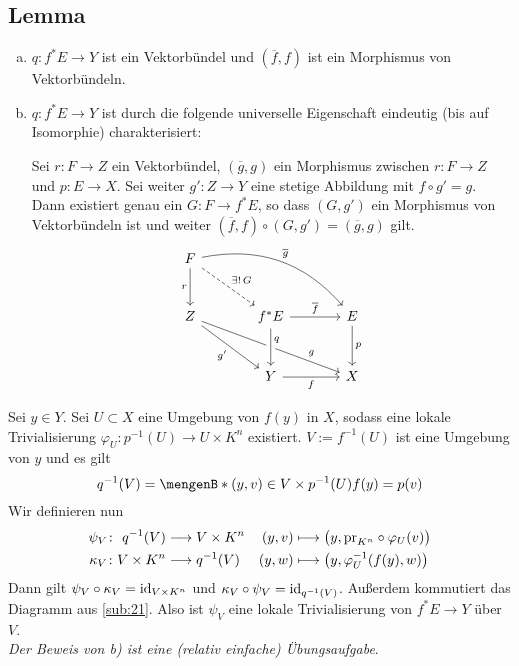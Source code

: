 \subsection[Lemma: Universelle Eigenschaft des Pullbacks]{Lemma} %
\label{sub:24}
\begin{enumerate}[a)]
	\item $q \colon f^* E \to Y$ ist ein Vektorbündel und $(\overline{f},f)$ ist ein Morphismus von Vektorbündeln.
	\item $q \colon f^* E \to Y$ ist durch die folgende universelle Eigenschaft eindeutig (bis auf Isomorphie) charakterisiert:
	
	Sei $r \colon F \to Z$ ein Vektorbündel, $(\overline{g},g)$ ein Morphismus zwischen $r \colon F \to Z$ und $p \colon E \to X$. Sei weiter $g' \colon Z \to Y$ eine 
	stetige Abbildung mit $f \circ g' = g$. Dann existiert genau ein $G \colon F \to f^* E$, so dass $(G,g')$ ein Morphismus von Vektorbündeln ist und weiter 
	$(\overline{f},f) \circ (G,g')= (\overline{g},g)$ gilt.
	\[
		\begin{tikzcd}[sep=large]
			F \drar["\exists!\, G", dashed] \dar["r"'] \arrow[bend left,"\overline{g}"]{drr} & & \\
			Z \drar["g'"'] \arrow["g" near end]{drr} & f^* E \rar["\overline{f}"] \dar["q" pos=0.3,crossing over] & E \dar["p"]\\
			& Y \rar["f"'] & X
		\end{tikzcd}
	\]
\end{enumerate}
Sei $y\in Y$. Sei $U \subset X$ eine Umgebung von $f(y)$ in $X$, sodass eine lokale Trivialisierung $\varphi_U \colon p ^{-1}(U) \to U \times K^n$ existiert. $V:= f^{-1}(U)$ 
ist eine Umgebung von $y$ und es gilt
\[
	q ^{-1}(V) = \set[(y,v) \in V \times p ^{-1}(U)]{f(y)=p(v)} 
\]
Wir definieren nun 
\begin{align*}
	\psi_V \colon \,\,q ^{-1}(V) &\longrightarrow V \times K^n &  (y,v)&\longmapsto \enbrace[\big]{y, \pr_{K^n} \circ \varphi_U(v)} \\
	\kappa_V \colon V \times K^n &\longrightarrow q ^{-1}(V) &  (y,w) &\longmapsto \enbrace*{y, \varphi_U^{-1} \enbrace*{f(y),w} } 
\end{align*}
Dann gilt $\psi_V \circ \kappa_V=\operatorname{id}_{V \times K^n}$ und $\kappa_V \circ \psi_V = \operatorname{id}_{q^{-1}(V)}$. Außerdem kommutiert das Diagramm aus \ref{sub:21}. Also ist $\psi_V$ eine 
lokale Trivialisierung von $f^*E \to Y$ über $V$. \\
\emph{Der Beweis von b) ist eine (relativ einfache) Übungsaufgabe}.\bewende

